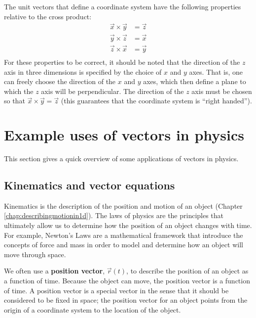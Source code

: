 The unit vectors that define a coordinate system have the following properties relative to the cross product:
\begin{align*}
\vec x \times \vec y &= \vec z\\
\vec y \times \vec z &= \vec x\\
\vec z \times \vec x &= \vec y\\
\end{align*}
For these properties to be correct, it should be noted that the direction of the $z$ axis in three dimensions is specified by the choice of $x$ and $y$ axes. That is, one can freely choose the direction of the $x$ and $y$ axes, which then define a plane to which the $z$ axis will be perpendicular. The direction of the $z$ axis must be chosen so that $\vec x \times \vec y = \vec z$ (this guarantees that the coordinate system is ``right handed''). 

\section{Example uses of vectors in physics}
This section gives a quick overview of some applications of vectors in physics.
\subsection{Kinematics and vector equations}
Kinematics is the description of the position and motion of an object (Chapter \ref{chap:describingmotionin1d}). The laws of physics are the principles that ultimately allow us to determine how the position of an object changes with time. For example, Newton's Laws are a mathematical framework that introduce the concepts of force and mass in order to model and determine how an object will move through space.

We often use a \textbf{position vector}, $\vec r(t)$, to describe the position of an object as a function of time. Because the object can move, the position vector is a function of time. A position vector is a special vector in the sense that it should be considered to be fixed in space; the position vector for an object points from the origin of a coordinate system to the location of the object. 

